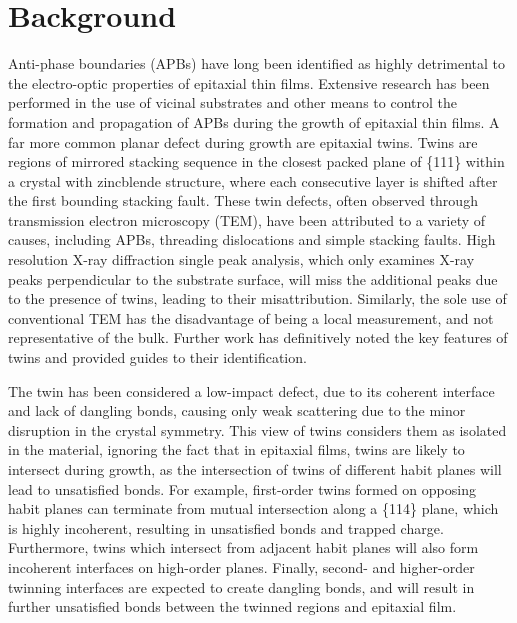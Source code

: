 \section{Background}
Anti-phase boundaries (APBs) have long been identified as highly detrimental to the electro-optic properties of epitaxial thin films\cite{Holt1969a}.
Extensive research has been performed in the use of vicinal substrates and other means\cite{Kroemer1987} to control the formation and propagation of APBs during the growth of epitaxial thin films.
A far more common planar defect during growth are epitaxial twins\cite{Ernst1989}.
Twins are regions of mirrored stacking sequence in the closest packed plane of \{111\} within a crystal with zincblende structure, where each consecutive layer is shifted after the first bounding stacking fault\cite{Wagner1966}.
These twin defects, often observed through transmission electron microscopy (TEM), have been attributed to a variety of causes, including APBs, threading dislocations and simple stacking faults\cite{Toyota2008b,Kim2006a,Xu2009,Proessdorf2010,Fischer1986a,Nguyen2004,Noge1987,Vila1995,Fischer1986}.
High resolution X-ray diffraction single peak analysis, which only examines X-ray peaks perpendicular to the substrate surface, will miss the additional peaks due to the presence of twins, leading to their misattribution.
Similarly, the sole use of conventional TEM has the disadvantage of being a local measurement, and not representative of the bulk.
Further work has definitively noted the key features of twins and provided guides to their identification\cite{Ernst1989}.

The twin has been considered a low-impact defect, due to its coherent interface and lack of dangling bonds, causing only weak scattering due to the minor disruption in the crystal symmetry.
This view of twins considers them as isolated in the material, ignoring the fact that in epitaxial films, twins are likely to intersect during growth, as the intersection of twins of different habit planes will lead to unsatisfied bonds.
For example, first-order twins formed on opposing habit planes can terminate from mutual intersection along a \{114\} plane, which is highly incoherent, resulting in unsatisfied bonds and trapped charge\cite{HORNSTRA1959}.
Furthermore, twins which intersect from adjacent habit planes will also form incoherent interfaces on high-order planes.
Finally, second- and higher-order twinning interfaces are expected to create dangling bonds, and will result in further unsatisfied bonds between the twinned regions and epitaxial film.

